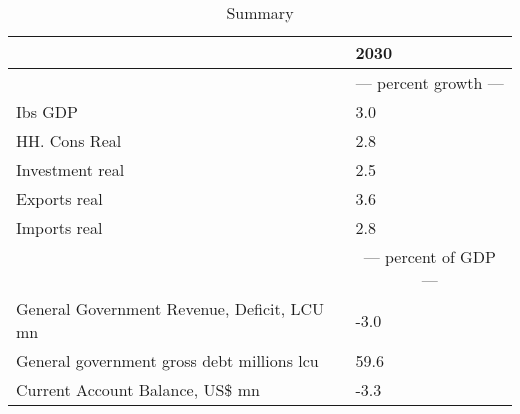 \documentclass{article}
\begin{document}
 \begin{table}
\caption{Summary}
\begin{tabular}{ll}
\toprule
 & 2030 \\
\midrule
&\multicolumn{1}{c}{--- percent growth ---}                     \\
Ibs GDP &                  3.0 \\
HH. Cons Real &                  2.8 \\
Investment real &                  2.5 \\
Exports real &                  3.6 \\
Imports real &                  2.8 \\
&\multicolumn{1}{c}{--- percent of GDP ---}                     \\
General Government Revenue, Deficit, LCU mn &                 -3.0 \\
General government gross debt millions lcu &                 59.6 \\
Current Account Balance, US\$ mn &                 -3.3 \\
\bottomrule
\end{tabular}
\end{table}
\end{document}
